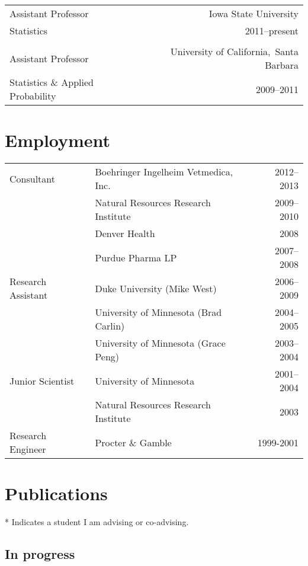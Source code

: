 \documentclass[overlapped,line]{res}
\begin{document}
\begin{resume}
\begin{tabular}{l@{\qquad}r}
Assistant Professor & Iowa State University \\
Statistics & 2011--present \\
\\
Assistant Professor & University of California,\ Santa Barbara \\
Statistics \& Applied Probability & 2009--2011
\end{tabular}


\section{\bf Employment}

\begin{tabular}{l@{\qquad}l@{\qquad}r}
Consultant & Boehringer Ingelheim Vetmedica, Inc. & 2012--2013 \\
 & Natural Resources Research Institute  & 2009--2010 \\
 & Denver Health & 2008 \\
 & Purdue Pharma LP & 2007--2008 \\
Research Assistant & Duke University (Mike West) & 2006--2009 \\
 & University of Minnesota (Brad Carlin) & 2004--2005 \\
 & University of Minnesota (Grace Peng) & 2003--2004 \\
Junior Scientist & University of Minnesota & 2001--2004 \\
 & Natural Resources Research Institute & 2003 \\
Research Engineer & Procter \& Gamble & 1999-2001
\end{tabular}


\section{Publications}

* Indicates a student I am advising or co-advising.

\vspace{-0.3in}

\subsection{\bf In progress} \vspace{-0.2in}


\end{resume}
\end{document}
